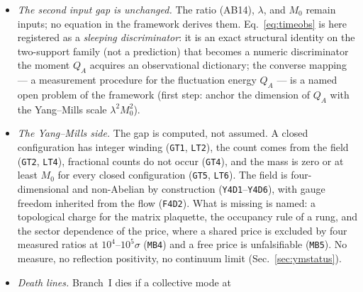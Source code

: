 \documentclass[aps,prd,preprint,superscriptaddress,amsmath,amssymb]{revtex4-2}
\begin{document}
\begin{itemize}
$\omega=ck+\beta k^2$, the group-velocity gap and the beat
wavelength are locked by $|\Delta v_g|\,\lambda_{\mathrm{beat}}
=4\pi|\beta|$ (GD9: the $k$-form $|\Delta v_g|=2|\beta||\Delta k|$
is machine-checked; the $\lambda$-form is the same identity rewritten
with $\lambda_{\mathrm{beat}}=2\pi/|\Delta k|$, verified numerically
as N12): a measured pair
$(\Delta v_g,\lambda_{\mathrm{beat}})$ determines $\beta$, and any
deviation is a framework-internal falsifier.  \emph{(iii) Extension-layer predictions (with new
inputs): two.}  The framework's own experimental program already
lists the signatures of its un-derived postulates --- the cyclotron
anomaly $R_{ci}=1/(1-\mu)-1$ (zero-hypothesis $R_{ci}=0$) and the
spin-polarized splitting
$\Delta R_{ci}=-2\varepsilon/((1-\mu)(1-\varepsilon^2))$ --- which
are conditional on the inputs $\mu,\varepsilon$ (SA8--SA9); we
record them here as the program's empirical contact, not as claims of
this paper.
\item \emph{The second input gap is unchanged.}  The ratio
(AB14), $\lambda$, and $M_0$ remain inputs; no equation in the
framework derives them.  Eq.~\ref{eq:timeobs} is here registered as a
\emph{sleeping discriminator}: it is an exact structural identity on
the two-support family (not a prediction) that becomes a numeric
discriminator the moment $Q_A$ acquires an observational dictionary;
the converse mapping --- a measurement procedure for the
fluctuation energy $Q_A$ --- is a named open problem of the
framework (first step: anchor the dimension of $Q_A$ with the
Yang--Mills scale $\lambda^2 M_0^2$).
\item \emph{The Yang--Mills side.}  The gap is computed, not assumed.
A closed configuration has integer winding (\texttt{GT1}, \texttt{LT2}),
the count comes from the field (\texttt{GT2}, \texttt{LT4}), fractional
counts do not occur (\texttt{GT4}), and the mass is zero or at least
$M_0$ for every closed configuration (\texttt{GT5}, \texttt{LT6}).  The
field is four-dimensional and non-Abelian by construction
(\texttt{Y4D1}--\texttt{Y4D6}), with gauge freedom inherited from the
flow (\texttt{F4D2}).  What is missing is named: a topological charge for
the matrix plaquette, the occupancy rule of a rung, and the sector
dependence of the price, where a shared price is excluded by four
measured ratios at $10^4$--$10^5\sigma$ (\texttt{MB4}) and a free price
is unfalsifiable (\texttt{MB5}).  No measure, no reflection positivity,
no continuum limit (Sec.~\ref{sec:ymstatus}).
\item \emph{Death lines.}  Branch~I dies if a collective mode at

\end{itemize}
\end{document}
